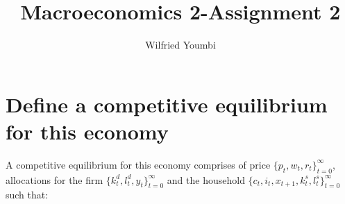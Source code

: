 \documentclass[12pt,a4paper]{article}
\begin{document}
\begin{titlepage}
\title{Macroeconomics 2-Assignment 2 }
\end{titlepage}
\author{Wilfried Youmbi\\} 
\maketitle



\section{Define a competitive equilibrium for this economy}
A competitive equilibrium for this economy comprises of price
$\{p_{t}, w_{t}, r_{t}\}^{\infty}_{t=0}$, allocations for the firm $\{k^{d}_{t}, l^{d}_{t}, y_{t}\}^{\infty}_{t=0}$ and the household $\{c_{t}, i_{t}, x_{t+1}, k^{s}_{t}, l^{s}_{t}\}^{\infty}_{t=0}$ such that:
\end{document}
